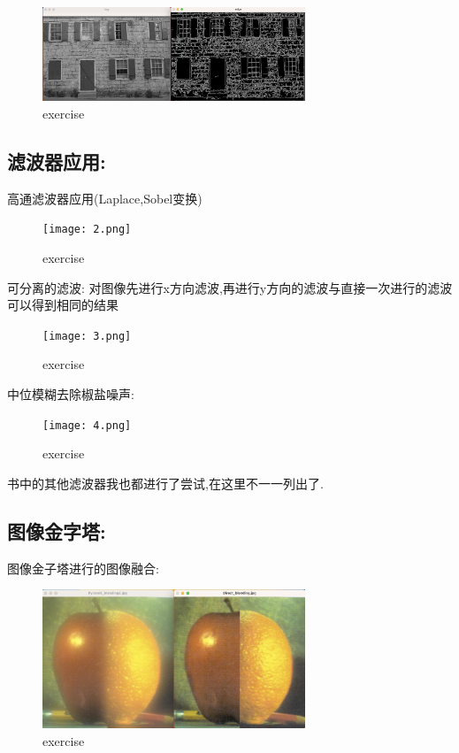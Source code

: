 \documentclass{article}
\begin{document}
\begin{figure}[H]
	\centering
	\includegraphics[width=0.7\textwidth]{1.png}
	\caption{\label{pr1}exercise}
	\end{figure}

\subsection*{滤波器应用:}
高通滤波器应用(Laplace,Sobel变换)
\begin{figure}[H]
	\centering
	\texttt{[image: 2.png]}
	\caption{\label{pr1}exercise}
	\end{figure}
    
可分离的滤波:
对图像先进行x方向滤波,再进行y方向的滤波与直接一次进行的滤波可以得到相同的结果
\begin{figure}[H]
	\centering
	\texttt{[image: 3.png]}
	\caption{\label{pr1}exercise}
	\end{figure}

中位模糊去除椒盐噪声:
\begin{figure}[H]
	\centering
	\texttt{[image: 4.png]}
	\caption{\label{pr1}exercise}
	\end{figure}

书中的其他滤波器我也都进行了尝试,在这里不一一列出了.

\subsection*{图像金字塔:}
图像金子塔进行的图像融合:
\begin{figure}[H]
	\centering
	\includegraphics[width=0.7\textwidth]{5.png}
	\caption{\label{pr1}exercise}
	\end{figure}
\end{document}
